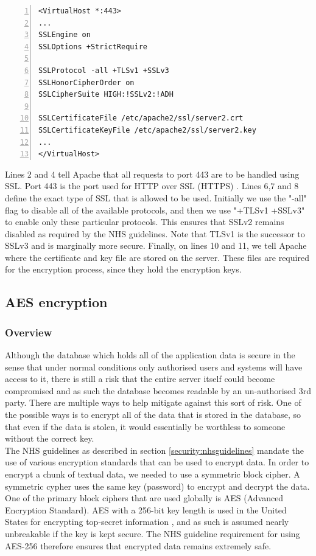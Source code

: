 \documentclass[11pt]{article}
\begin{document}
\begin{lstlisting}[float=ht,numbers=left,frame=lines,caption="Apache httpd.conf",label=apachehttpd,basicstyle=\ttfamily\small,showstringspaces=false]
<VirtualHost *:443>
...
SSLEngine on
SSLOptions +StrictRequire

SSLProtocol -all +TLSv1 +SSLv3
SSLHonorCipherOrder on
SSLCipherSuite HIGH:!SSLv2:!ADH

SSLCertificateFile /etc/apache2/ssl/server2.crt
SSLCertificateKeyFile /etc/apache2/ssl/server2.key
...
</VirtualHost>
\end{lstlisting}


Lines 2 and 4 tell Apache that all requests to port 443 are to be handled using SSL. Port 443 is the port used for HTTP over SSL (HTTPS) \cite{port443}. Lines 6,7 and 8 define the exact type of SSL that is allowed to be used. Initially we use the "-all" flag to disable all of the available protocols, and then we use "+TLSv1 +SSLv3" to enable only these particular protocols. This ensures that SSLv2 remains disabled as required by the NHS guidelines. Note that TLSv1 is the successor to SSLv3 and is marginally more secure. Finally, on lines 10 and 11, we tell Apache where the certificate and key file are stored on the server. These files are required for the encryption process, since they hold the encryption keys.

\subsection{AES encryption}
\subsubsection{Overview}

Although the database which holds all of the application data is secure in the sense that under normal conditions only authorised users and systems will have access to it, there is still a risk that the entire server itself could become compromised and as such the database becomes readable by an un-authorised 3rd party. There are multiple ways to help mitigate against this sort of risk. One of the possible ways is to encrypt all of the data that is stored in the database, so that even if the data is stolen, it would essentially be worthless to someone without the correct key. 
\\ \indent
The NHS guidelines as described in section \ref{security:nhsguidelines} mandate the use of various encryption standards that can be used to encrypt data. In order to encrypt a chunk of textual data, we needed to use a symmetric block cipher. A symmetric cypher uses the same key (password) to encrypt and decrypt the data. One of the primary block ciphers that are used globally is AES (Advanced Encryption Standard). AES with a 256-bit key length is used in the United States for encrypting top-secret information \cite{aes:nsa}, and as such is assumed nearly unbreakable if the key is kept secure. The NHS guideline requirement for using AES-256 therefore ensures that encrypted data remains extremely safe.
\end{document}
